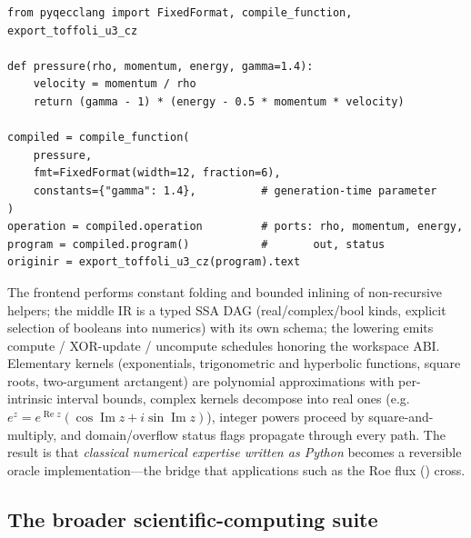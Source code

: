 \begin{lstlisting}[style=pyqpython, caption={Compiling a pure Python numerical function to a reversible module (verbatim from the doctested manual; the gas-dynamics pressure function used by the QFVM pipeline of \secref{sec:casestudies}).  The compiler reads the abstract syntax tree (imports restricted to \texttt{math}/\texttt{cmath}; no execution), folds constants, emits a typed SSA middle IR (MIR~0.1), and lowers to an RIR module with fixed-point ports and propagated status flags.  The calling convention is the XOR-update ABI: inputs preserved, result XOR'd into the \texttt{out} register, domain/overflow state XOR'd into \texttt{status}.}, label={lst:mathfunc}]
from pyqecclang import FixedFormat, compile_function, export_toffoli_u3_cz

def pressure(rho, momentum, energy, gamma=1.4):
    velocity = momentum / rho
    return (gamma - 1) * (energy - 0.5 * momentum * velocity)

compiled = compile_function(
    pressure,
    fmt=FixedFormat(width=12, fraction=6),
    constants={"gamma": 1.4},          # generation-time parameter
)
operation = compiled.operation         # ports: rho, momentum, energy,
program = compiled.program()           #       out, status
originir = export_toffoli_u3_cz(program).text
\end{lstlisting}

The frontend performs constant folding and bounded inlining of non-recursive
helpers; the middle IR is a typed SSA DAG (real/complex/bool kinds, explicit
selection of booleans into numerics) with its own schema; the lowering emits
compute / XOR-update / uncompute schedules honoring the workspace ABI.
Elementary kernels (exponentials, trigonometric and hyperbolic functions,
square roots, two-argument arctangent) are polynomial approximations with
per-intrinsic interval bounds, complex kernels decompose into real ones
(e.g.\ $e^{z} = e^{\operatorname{Re}z}(\cos\operatorname{Im}z +
i\sin\operatorname{Im}z)$), integer powers proceed by square-and-multiply,
and domain/overflow status flags propagate through every path.  The result
is that \emph{classical numerical expertise written as Python} becomes a
reversible oracle implementation---the bridge that applications such as the
Roe flux () cross.

\subsection{The broader scientific-computing suite}
\label{sec:sc-suite}

